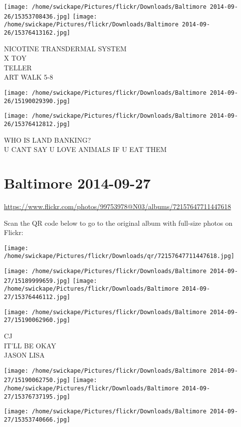 \documentclass[10pt,letterpaper]{article}
\begin{document}
\texttt{[image: /home/swickape/Pictures/flickr/Downloads/Baltimore 2014-09-26/15353708436.jpg]}
\texttt{[image: /home/swickape/Pictures/flickr/Downloads/Baltimore 2014-09-26/15376413162.jpg]}

NICOTINE TRANSDERMAL SYSTEM\\
X TOY\\
TELLER\\
ART WALK 5{-}8
\pagebreak

\texttt{[image: /home/swickape/Pictures/flickr/Downloads/Baltimore 2014-09-26/15190029390.jpg]}

\vspace{0.25in}
\texttt{[image: /home/swickape/Pictures/flickr/Downloads/Baltimore 2014-09-26/15376412812.jpg]}

WHO IS LAND BANKING?\\
U CANT SAY U LOVE ANIMALS IF U EAT THEM
\pagebreak

\section*{Baltimore 2014-09-27}

\url{https://www.flickr.com/photos/99753978@N03/albums/72157647711447618}

Scan the QR code below to go to the original album with full-size photos on Flickr:

\texttt{[image: /home/swickape/Pictures/flickr/Downloads/qr/72157647711447618.jpg]}
\pagebreak

\texttt{[image: /home/swickape/Pictures/flickr/Downloads/Baltimore 2014-09-27/15189999659.jpg]}
\texttt{[image: /home/swickape/Pictures/flickr/Downloads/Baltimore 2014-09-27/15376446112.jpg]}

\vspace{0.25in}
\texttt{[image: /home/swickape/Pictures/flickr/Downloads/Baltimore 2014-09-27/15190062960.jpg]}

CJ\\
IT'LL BE OKAY\\
JASON LISA
\pagebreak

\texttt{[image: /home/swickape/Pictures/flickr/Downloads/Baltimore 2014-09-27/15190062750.jpg]}
\texttt{[image: /home/swickape/Pictures/flickr/Downloads/Baltimore 2014-09-27/15376737195.jpg]}

\vspace{0.25in}
\texttt{[image: /home/swickape/Pictures/flickr/Downloads/Baltimore 2014-09-27/15353740666.jpg]}
\end{document}
